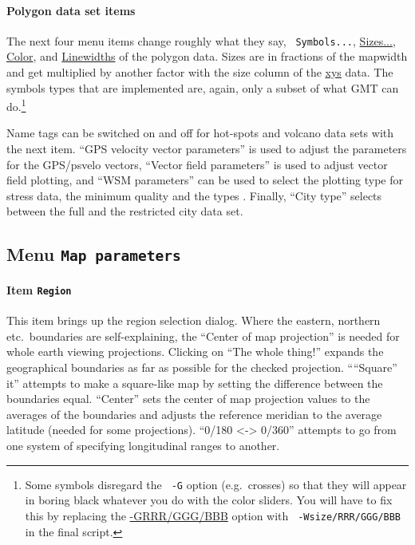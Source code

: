\documentclass[11pt]{article}
\begin{document}
\paragraph{Polygon data set items}
The next four menu items change roughly what they say, {\tt
  Symbols...}, \url{Sizes...}, \url{Color}, and \url{Linewidths} of
the polygon data.  Sizes are in fractions of the mapwidth and get
multiplied by another factor with the size column of the \url{xys}
data.  The symbols types that are implemented are, again, only a
subset of what GMT can do.\footnote{Some symbols disregard the {\tt
    -G} option (e.g.\ crosses) so that they will appear in boring
  black whatever you do with the color sliders. You will have to fix
  this by replacing the \url{-GRRR/GGG/BBB} option with {\tt
    -Wsize/RRR/GGG/BBB} in the final script.}

Name tags can be switched on and off for hot-spots and volcano data
sets with the next item. ``GPS velocity vector
parameters'' is used to adjust the parameters for the GPS/psvelo
vectors, ``Vector field parameters'' is used to adjust vector field
plotting, and ``WSM parameters'' can be used to select the plotting type for
stress data, the minimum quality and the types \citep{mueller00}.
Finally, ``City type'' selects between the full and the restricted
city data set.



\subsection{Menu {\tt Map parameters}}
\paragraph{Item {\tt Region}}
This item brings up the region selection dialog. Where the eastern,
northern etc.\ boundaries are self-explaining, the ``Center of map
projection'' is needed for whole earth viewing projections. Clicking
on ``The whole thing!'' expands the geographical boundaries as far as
possible for the checked projection. ````Square'' it'' attempts to
make a square-like map by setting the difference between the
boundaries equal. ``Center'' sets the center of map projection values
to the averages of the boundaries and adjusts the reference meridian
to the average latitude (needed for some projections). ``0/180 <->
0/360'' attempts to go from one system of specifying longitudinal
ranges to another.
\end{document}

